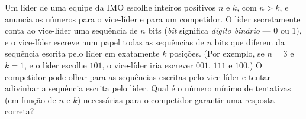 Um lider de uma equipe da IMO escolhe inteiros positivos $n$ e $k$, com $n > k$, e anuncia os números para o vice-líder e para um competidor.
O líder secretamente conta ao vice-líder uma sequência de $n$ bits (\emph{bit} significa \emph{dígito binário} --- $0$ ou $1$), e o vice-líder escreve num papel todas as sequências de $n$ bits que diferem da sequência escrita pelo líder em exatamente $k$ posições.
(Por exemplo, se $n = 3$ e $k = 1$, e o líder escolhe $101$, o vice-líder iria escrever $001$, $111$ e $100$.)
O competidor pode olhar para as sequências escritas pelo vice-líder e tentar adivinhar a sequência escrita pelo líder.
Qual é o número mínimo de tentativas (em função de $n$ e $k$) necessárias para o competidor garantir uma resposta correta?
